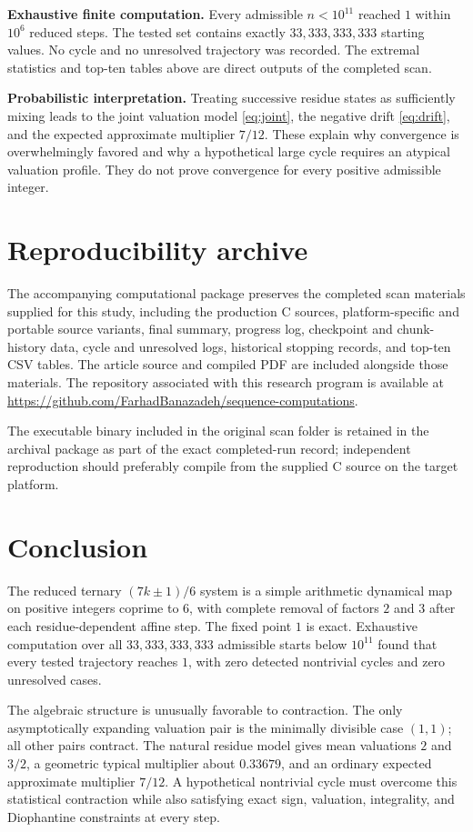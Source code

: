 \documentclass[11pt]{article}
\begin{document}
\textbf{Exhaustive finite computation.} Every admissible $n<10^{11}$ reached $1$ within $10^6$ reduced steps. The tested set contains exactly $33,333,333,333$ starting values. No cycle and no unresolved trajectory was recorded. The extremal statistics and top-ten tables above are direct outputs of the completed scan.

\textbf{Probabilistic interpretation.} Treating successive residue states as sufficiently mixing leads to the joint valuation model \eqref{eq:joint}, the negative drift \eqref{eq:drift}, and the expected approximate multiplier $7/12$. These explain why convergence is overwhelmingly favored and why a hypothetical large cycle requires an atypical valuation profile. They do not prove convergence for every positive admissible integer.

\section{Reproducibility archive}
The accompanying computational package preserves the completed scan materials supplied for this study, including the production C sources, platform-specific and portable source variants, final summary, progress log, checkpoint and chunk-history data, cycle and unresolved logs, historical stopping records, and top-ten CSV tables. The article source and compiled PDF are included alongside those materials. The repository associated with this research program is available at \url{https://github.com/FarhadBanazadeh/sequence-computations}.

The executable binary included in the original scan folder is retained in the archival package as part of the exact completed-run record; independent reproduction should preferably compile from the supplied C source on the target platform.

\section{Conclusion}
The reduced ternary $(7k\pm1)/6$ system is a simple arithmetic dynamical map on positive integers coprime to $6$, with complete removal of factors $2$ and $3$ after each residue-dependent affine step. The fixed point $1$ is exact. Exhaustive computation over all $33,333,333,333$ admissible starts below $10^{11}$ found that every tested trajectory reaches $1$, with zero detected nontrivial cycles and zero unresolved cases.

The algebraic structure is unusually favorable to contraction. The only asymptotically expanding valuation pair is the minimally divisible case $(1,1)$; all other pairs contract. The natural residue model gives mean valuations $2$ and $3/2$, a geometric typical multiplier about $0.33679$, and an ordinary expected approximate multiplier $7/12$. A hypothetical nontrivial cycle must overcome this statistical contraction while also satisfying exact sign, valuation, integrality, and Diophantine constraints at every step.
\end{document}
